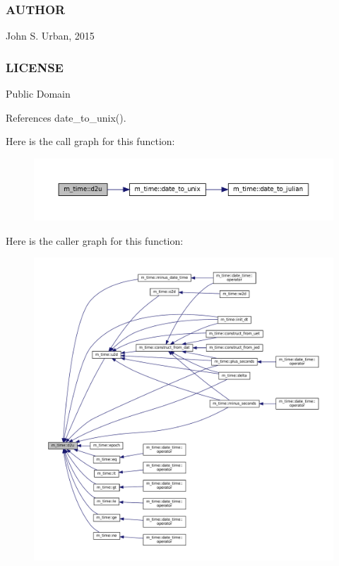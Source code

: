  \subsubsection*{A\+U\+T\+H\+OR}

John S. Urban, 2015 \subsubsection*{L\+I\+C\+E\+N\+SE}

Public Domain 

References date\+\_\+to\+\_\+unix().

Here is the call graph for this function\+:\nopagebreak
\begin{figure}[H]
\begin{center}
\leavevmode
\includegraphics[width=350pt]{namespacem__time_a1506e2889a156387df4481ed0534be81_cgraph}
\end{center}
\end{figure}
Here is the caller graph for this function\+:\nopagebreak
\begin{figure}[H]
\begin{center}
\leavevmode
\includegraphics[width=350pt]{namespacem__time_a1506e2889a156387df4481ed0534be81_icgraph}
\end{center}
\end{figure}
\mbox{\label{namespacem__time_ad4ff99ad6f6d5282c4b65ad636a2a627}} 
